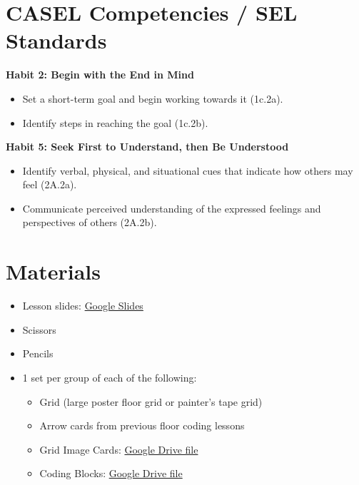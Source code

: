 \documentclass[11pt]{article}
\begin{document}
\section*{CASEL Competencies / SEL Standards}
\textbf{Habit 2: Begin with the End in Mind}
\begin{itemize}[leftmargin=*, itemsep=2pt, topsep=2pt]
  \item Set a short-term goal and begin working towards it (1c.2a).
  \item Identify steps in reaching the goal (1c.2b).
\end{itemize}

\textbf{Habit 5: Seek First to Understand, then Be Understood}
\begin{itemize}[leftmargin=*, itemsep=2pt, topsep=2pt]
  \item Identify verbal, physical, and situational cues that indicate how others may feel (2A.2a).
  \item Communicate perceived understanding of the expressed feelings and perspectives of others (2A.2b).
\end{itemize}

\section*{Materials}
\begin{itemize}[leftmargin=*, itemsep=2pt]
  \item Lesson slides: \href{https://docs.google.com/presentation/d/1G4IpqZIOp2TA8rVbL_0ee6OcGJEQgzUFjs5EIqG4TUI/edit?usp=drive_link}{Google Slides}
  \item Scissors
  \item Pencils
  \item 1 set per group of each of the following:
  \begin{itemize}[leftmargin=*, itemsep=2pt, topsep=2pt]
    \item Grid (large poster floor grid or painter's tape grid)
    \item Arrow cards from previous floor coding lessons
    \item Grid Image Cards: \href{https://drive.google.com/file/d/1ClL1QXeXpdP8ZqEM5PqSFkxkPQmzM-Ar/view?usp=drive_link}{Google Drive file}
    \item Coding Blocks: \href{https://drive.google.com/file/d/1CcwKTvvuaAUUFdJQmUwmJLqmrSo3At6b/view?usp=drive_link}{Google Drive file}
  \end{itemize}
\end{itemize}
\end{document}
